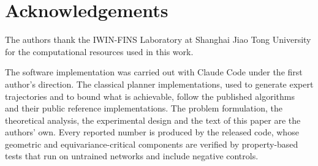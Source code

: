 \documentclass[10pt,twocolumn,letterpaper]{article}
\begin{document}
\section*{Acknowledgements}

The authors thank the IWIN-FINS Laboratory at Shanghai Jiao Tong University for
the computational resources used in this work.

The software implementation was carried out with Claude Code under the first
author's direction. The classical planner implementations, used to generate
expert trajectories and to bound what is achievable, follow the published
algorithms~\cite{kuffner2000rrtconnect,schulman2014trajopt,zucker2013chomp} and
their public reference implementations. The problem formulation, the theoretical
analysis, the experimental design and the text of this paper are the authors'
own. Every reported number is produced by the released code, whose geometric and
equivariance-critical components are verified by property-based tests that run on
untrained networks and include negative controls.
\end{document}
